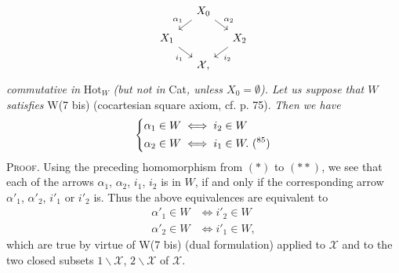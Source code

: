 \documentclass[11pt]{article}
\newcommand{\printedpage}[1]{\marginpar{\footnotesize p.~#1}}
\newcommand{\msp}[1]{\marginpar{\footnotesize [#1]}}
\newcommand{\Hot}{\mathrm{Hot}}
\newcommand{\cX}{\mathcal{X}}
\begin{document}
\printedpage{85}
\[
\begin{tikzcd}[column sep=small, row sep=small, ampersand replacement=\&]
 \& X_0 \arrow[dl, "\alpha_1"'] \arrow[dr, "\alpha_2"] \& \\
X_1 \arrow[dr, "i_1"'] \& \& X_2 \arrow[dl, "i_2"] \\
 \& \cX, \&
\end{tikzcd}
\]
\msp{page 126}
\textit{commutative in} $\Hot_W$ \textit{(but not in} Cat\textit{, unless $X_0 = \emptyset$). Let us suppose that $W$ satisfies} W(7 bis) (cocartesian square axiom, cf. p. 75). \textit{Then we have}
\[
\left\{
\begin{aligned}
\alpha_1\in W &\iff i_2\in W\\
\alpha_2\in W &\iff i_1\in W. \text{ (\footnotemark[85])}
\end{aligned}
\right.
\]
\textsc{Proof}. Using the preceding homomorphism from $(*)$ to $(**)$, we see that each of the arrows $\alpha_1$, $\alpha_2$, $i_1$, $i_2$ is in $W$, if and only if the corresponding arrow $\alpha'_1$, $\alpha'_2$, $i'_1$ or $i'_2$ is. Thus the above equivalences are equivalent to
\[
\begin{aligned}
\alpha'_1\in W &\iff i'_2\in W\\
\alpha'_2\in W &\iff i'_1\in W,
\end{aligned}
\]
which are true by virtue of W(7 bis) (dual formulation) applied to $\cX$ and to the two closed subsets $1\backslash\cX$, $2\backslash\cX$ of $\cX$.
\end{document}
